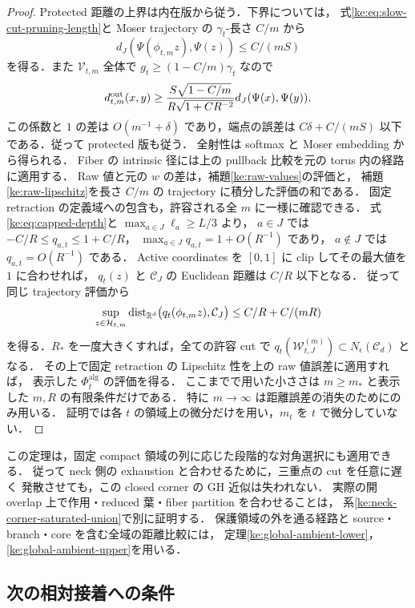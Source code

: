 \begin{proof}
Protected 距離の上界は内在版から従う．下界については，
式\eqref{ke:eq:slow-cut-pruning-length}と Moser trajectory の
$\gamma_t$-長さ $C/m$ から
\[
 d_J(\Psi(\phi_{t,m}z),\Psi(z))\le C/(mS)
\]
を得る．また $\mathcal V_{t,m}$ 全体で $g_t\ge(1-C/m)\gamma_t$ なので
\[
 d_{t,m}^{\rm out}(x,y)
 \ge\frac{S\sqrt{1-C/m}}{R\sqrt{1+CR^{-2}}}
       d_J(\Psi(x),\Psi(y)).
\]
この係数と $1$ の差は $O(m^{-1}+\delta)$ であり，端点の誤差は
$C\delta+C/(mS)$ 以下である．従って protected 版も従う．
全射性は softmax と Moser embedding から得られる．
Fiber の intrinsic 径には上の pullback 比較を元の torus 内の経路に適用する．
Raw 値と元の $w$ の差は，補題\ref{ke:raw-values}の評価と，
補題\ref{ke:raw-lipschitz}を長さ $C/m$ の trajectory に積分した評価の和である．
固定 retraction の定義域への包含も，許容される全 $m$ に一様に確認できる．
式\eqref{ke:eq:capped-depth}と $\max_{a\in J}\ell_a\ge L/3$ より，
$a\in J$ では $-C/R\le q_{a,t}\le1+C/R$，
$\max_{a\in J}q_{a,t}=1+O(R^{-1})$ であり，
$a\notin J$ では $q_{a,t}=O(R^{-1})$ である．
Active coordinates を $[0,1]$ に clip してその最大値を $1$ に合わせれば，
$q_t(z)$ と $\mathcal C_J$ の Euclidean 距離は $C/R$ 以下となる．
従って同じ trajectory 評価から
\[
 \sup_{z\in\mathcal H_{t,m}}
 \operatorname{dist}_{\mathbb R^d}\bigl(q_t(\phi_{t,m}z),\mathcal C_J\bigr)
 \le C/R+C/(mR)
\]
を得る．$R_*$ を一度大きくすれば，全ての許容 cut で
$q_t(\mathcal W_{t,J}^{(m)})\subset N_\epsilon(\mathcal C_d)$ となる．
その上で固定 retraction の Lipschitz 性を上の raw 値誤差に適用すれば，
表示した $\Phi_t^{\mathrm{alg}}$ の評価を得る．
ここまでで用いた小ささは $m\ge m_*$ と表示した $m,R$ の有限条件だけである．
特に $m\to\infty$ は距離誤差の消失のためにのみ用いる．
証明では各 $t$ の領域上の微分だけを用い，$m_t$ を $t$ で微分していない．
\end{proof}

この定理は，固定 compact 領域の列に応じた段階的な対角選択にも適用できる．
従って neck 側の exhaustion と合わせるために，三重点の cut を任意に遅く
発散させても，この closed corner の GH 近似は失われない．
実際の開 overlap 上で作用・reduced 葉・fiber partition を合わせることは，
系\ref{ke:neck-corner-saturated-union}で別に証明する．
保護領域の外を通る経路と source・branch・core を含む全域の距離比較には，
定理\ref{ke:global-ambient-lower}，\ref{ke:global-ambient-upper}を用いる．

\subsection{次の相対接着への条件}

